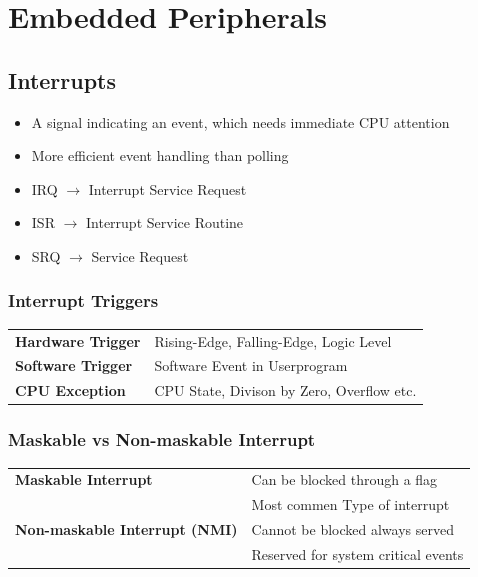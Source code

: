 \section{Embedded Peripherals}
\subsection{Interrupts}
\begin{itemize}
	\item A signal indicating an event, which needs immediate CPU attention
	\item More efficient event handling than polling
	\item IRQ $\rightarrow$ Interrupt Service Request
	\item ISR $\rightarrow$ Interrupt Service Routine
	\item SRQ $\rightarrow$ Service Request
\end{itemize}
	\subsubsection{Interrupt Triggers}
	\begin{tabular}{ll}
		\textbf{Hardware Trigger}& Rising-Edge, Falling-Edge, Logic Level\\
		\textbf{Software Trigger}& Software Event in Userprogram\\
		\textbf{CPU Exception}& CPU State, Divison by Zero, Overflow etc.\\
	\end{tabular}
	\subsubsection{Maskable vs Non-maskable Interrupt}
	\begin{tabular}{ll}
		\textbf{Maskable Interrupt}& Can be blocked through a flag\\
		& Most commen Type of interrupt\\
		\textbf{Non-maskable Interrupt (NMI)}& Cannot be blocked always served\\
		& Reserved for system critical events\\
	\end{tabular}
